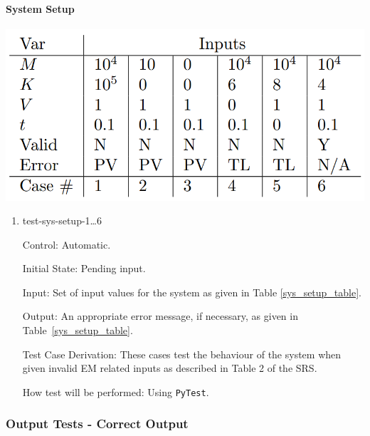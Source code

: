 \documentclass[12pt, titlepage]{article}
\begin{document}
\paragraph{System Setup}
\begin{center}
  \includegraphics[scale=0.49]{SysInputTable.PNG} \\
  \label{sys_setup_table}
\end{center}

\begin{enumerate}

  \item{test-sys-setup-1\dots6\\}
  
  Control: Automatic.
            
  Initial State: Pending input.
            
  Input: Set of input values for the system as given in Table \ref{sys_setup_table}.
            
  Output: An appropriate error message, if necessary, as given in Table~\ref{sys_setup_table}.
  
  Test Case Derivation: These cases test the behaviour of the system when given invalid EM related inputs as described in Table 2 of the SRS.
            
  How test will be performed: Using \texttt{PyTest}. 
\end{enumerate}

\newpage

\subsubsection{Output Tests - Correct Output}
\end{document}
